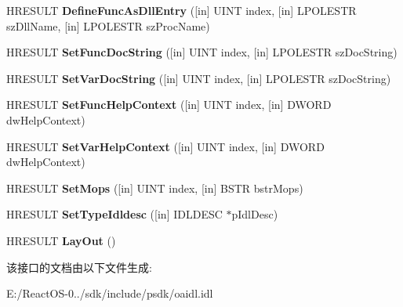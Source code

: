 \begin{DoxyCompactItemize}
\item 
\mbox{\label{interface_i_create_type_info_a5dd65563e3350996f899a14b1b38f02a}} 
H\+R\+E\+S\+U\+LT {\bfseries Define\+Func\+As\+Dll\+Entry} (\mbox{[}in\mbox{]} U\+I\+NT index, \mbox{[}in\mbox{]} L\+P\+O\+L\+E\+S\+TR sz\+Dll\+Name, \mbox{[}in\mbox{]} L\+P\+O\+L\+E\+S\+TR sz\+Proc\+Name)
\item 
\mbox{\label{interface_i_create_type_info_a1d2853e0d2f60edf2590b93a06c998be}} 
H\+R\+E\+S\+U\+LT {\bfseries Set\+Func\+Doc\+String} (\mbox{[}in\mbox{]} U\+I\+NT index, \mbox{[}in\mbox{]} L\+P\+O\+L\+E\+S\+TR sz\+Doc\+String)
\item 
\mbox{\label{interface_i_create_type_info_ab6a25103774982dbd683c3f12ddb6984}} 
H\+R\+E\+S\+U\+LT {\bfseries Set\+Var\+Doc\+String} (\mbox{[}in\mbox{]} U\+I\+NT index, \mbox{[}in\mbox{]} L\+P\+O\+L\+E\+S\+TR sz\+Doc\+String)
\item 
\mbox{\label{interface_i_create_type_info_a5e6a29fa4bb1af036efa00894f313781}} 
H\+R\+E\+S\+U\+LT {\bfseries Set\+Func\+Help\+Context} (\mbox{[}in\mbox{]} U\+I\+NT index, \mbox{[}in\mbox{]} D\+W\+O\+RD dw\+Help\+Context)
\item 
\mbox{\label{interface_i_create_type_info_ac3a26a42301a7e42fdbfc95c219a62c7}} 
H\+R\+E\+S\+U\+LT {\bfseries Set\+Var\+Help\+Context} (\mbox{[}in\mbox{]} U\+I\+NT index, \mbox{[}in\mbox{]} D\+W\+O\+RD dw\+Help\+Context)
\item 
\mbox{\label{interface_i_create_type_info_a31b92ee54cd7fe54196bc9290c95e21e}} 
H\+R\+E\+S\+U\+LT {\bfseries Set\+Mops} (\mbox{[}in\mbox{]} U\+I\+NT index, \mbox{[}in\mbox{]} B\+S\+TR bstr\+Mops)
\item 
\mbox{\label{interface_i_create_type_info_aae734ead3d68fbadc3660ab286da31a3}} 
H\+R\+E\+S\+U\+LT {\bfseries Set\+Type\+Idldesc} (\mbox{[}in\mbox{]} I\+D\+L\+D\+E\+SC $\ast$p\+Idl\+Desc)
\item 
\mbox{\label{interface_i_create_type_info_af3f6094769676c7530c084329b420c87}} 
H\+R\+E\+S\+U\+LT {\bfseries Lay\+Out} ()
\end{DoxyCompactItemize}


该接口的文档由以下文件生成\+:\begin{DoxyCompactItemize}
\item 
E\+:/\+React\+O\+S-\/0../sdk/include/psdk/oaidl.\+idl\end{DoxyCompactItemize}
